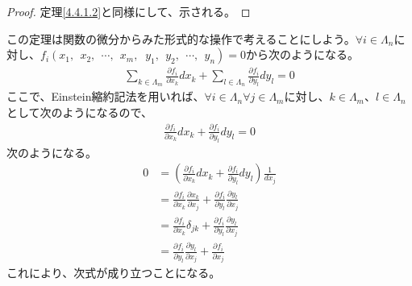 \documentclass[dvipdfmx]{jsarticle}
\begin{document}
\begin{proof} 定理\ref{4.4.1.2}と同様にして、示される。
\end{proof}\par
この定理は関数の微分からみた形式的な操作で考えることにしよう。$\forall i \in \varLambda_{n}$に対し、$f_{i}\left( x_{1},\ \ x_{2},\ \ \cdots,\ \ x_{m},\right. \ $ $\left. y_{1},\ \ y_{2},\ \ \cdots,\ \ y_{n} \right) = 0$から次のようになる。
\begin{align*}
\sum_{k \in \varLambda_{m}} {\frac{\partial f_{i}}{\partial x_{k}}dx_{k}} + \sum_{l \in \varLambda_{n}} {\frac{\partial f_{i}}{\partial y_{l}}dy_{l}} = 0
\end{align*}
ここで、Einstein縮約記法を用いれば、$\forall i\in \varLambda_{n} \forall j\in \varLambda_{m} $に対し、$k\in \varLambda_{m} $、$l\in \varLambda_{n} $として次のようになるので、
\begin{align*}
\frac{\partial f_{i} }{\partial x_k } dx_{k} + \frac{\partial f_{i} }{\partial y_{l} } dy_{l} =0
\end{align*}
次のようになる。
\begin{align*}
0 &= \left( \frac{\partial f_{i} }{\partial x_{k} } dx_{k} + \frac{\partial f_{i} }{\partial y_{l} } dy_{l} \right) \frac{1}{dx_{j} } \\
&= \frac{\partial f_{i} }{\partial x_{k} } \frac{\partial x_{k} }{\partial x_{j} } + \frac{\partial f_{i} }{\partial y_{l} } \frac{\partial y_{l} }{\partial x_{j} } \\
&= \frac{\partial f_{i} }{\partial x_{k} } \delta_{jk} + \frac{\partial f_{i} }{\partial y_{l} } \frac{\partial y_{l} }{\partial x_{j} } \\
&= \frac{\partial f_{i} }{\partial y_{l} } \frac{\partial y_{l} }{\partial x_{j} } + \frac{\partial f_{i} }{\partial x_{j} } 
\end{align*}
これにより、次式が成り立つことになる。
\end{document}
